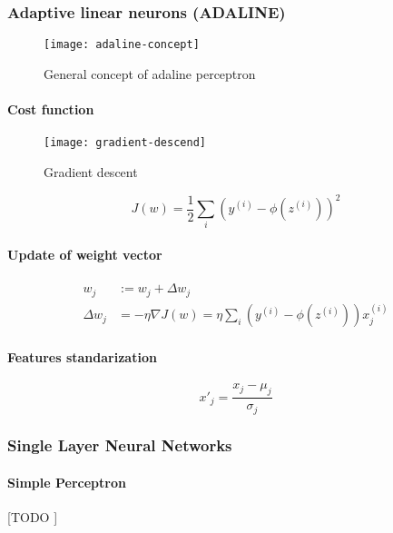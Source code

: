 \documentclass{article}
\begin{document}
			\subsubsection{Adaptive linear neurons (ADALINE)}

			\begin{figure}
				\centering
				\texttt{[image: adaline-concept]}
				\caption{General concept of adaline perceptron}
				\label{fig:adaline-concept}
			\end{figure}

			\paragraph{Cost function}

			\begin{figure}
				\centering
				\texttt{[image: gradient-descend]}
				\caption{Gradient descent}
				\label{fig:gradient-descend}
			\end{figure}

			\begin{equation}
				J(w) = \frac{1}{2} \sum_i (y^{(i)}-\phi(z^{(i)}))^2
			\end{equation}

			\paragraph{Update of weight vector}

			\begin{align}
					w_j &:= w_j + \Delta w_j \\
					\Delta w_j &= -\eta\nabla J(w) = \eta\sum_i (y^{(i)} -\phi(z^{(i)}))x^{(i)}_j
			\end{align}

			\paragraph{Features standarization}

			\begin{equation}
				x'_j = \frac{x_j - \mu_j}{\sigma_j}
			\end{equation}


			\subsubsection{Single Layer Neural Networks}
			\label{sec:single-layer-nn}


				\paragraph{Simple Perceptron}
				\label{sec:perceptron}
				[TODO ]
\end{document}
